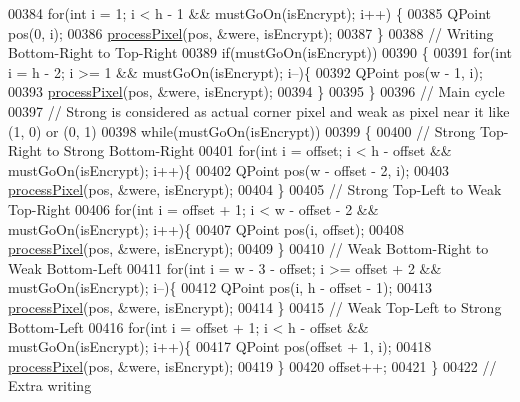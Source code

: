 \begin{DoxyCode}
00384     \textcolor{keywordflow}{for}(\textcolor{keywordtype}{int} i = 1; i < h - 1 && mustGoOn(isEncrypt); i++) \{
00385         QPoint pos(0, i);
00386         \hyperlink{class_model_p_c_a1171f9fe1550133dc9053a46b4e5bcfd}{processPixel}(pos, &were, isEncrypt);
00387     \}
00388     \textcolor{comment}{// Writing Bottom-Right to Top-Right}
00389     \textcolor{keywordflow}{if}(mustGoOn(isEncrypt))
00390     \{
00391         \textcolor{keywordflow}{for}(\textcolor{keywordtype}{int} i = h - 2; i >= 1 && mustGoOn(isEncrypt); i--)\{
00392             QPoint pos(w - 1, i);
00393             \hyperlink{class_model_p_c_a1171f9fe1550133dc9053a46b4e5bcfd}{processPixel}(pos, &were, isEncrypt);
00394         \}
00395     \}
00396     \textcolor{comment}{// Main cycle}
00397     \textcolor{comment}{// Strong is considered as actual corner pixel and weak as pixel near it like (1, 0) or (0, 1)}
00398     \textcolor{keywordflow}{while}(mustGoOn(isEncrypt))
00399     \{
00400         \textcolor{comment}{// Strong Top-Right to Strong Bottom-Right}
00401         \textcolor{keywordflow}{for}(\textcolor{keywordtype}{int} i = offset; i < h - offset && mustGoOn(isEncrypt); i++)\{
00402             QPoint pos(w - offset - 2, i);
00403             \hyperlink{class_model_p_c_a1171f9fe1550133dc9053a46b4e5bcfd}{processPixel}(pos, &were, isEncrypt);
00404         \}
00405         \textcolor{comment}{// Strong Top-Left to Weak Top-Right}
00406         \textcolor{keywordflow}{for}(\textcolor{keywordtype}{int} i = offset + 1; i < w - offset - 2 && mustGoOn(isEncrypt); i++)\{
00407             QPoint pos(i, offset);
00408             \hyperlink{class_model_p_c_a1171f9fe1550133dc9053a46b4e5bcfd}{processPixel}(pos, &were, isEncrypt);
00409         \}
00410         \textcolor{comment}{// Weak Bottom-Right to Weak Bottom-Left}
00411         \textcolor{keywordflow}{for}(\textcolor{keywordtype}{int} i = w - 3 - offset; i >= offset + 2 && mustGoOn(isEncrypt); i--)\{
00412             QPoint pos(i, h - offset - 1);
00413             \hyperlink{class_model_p_c_a1171f9fe1550133dc9053a46b4e5bcfd}{processPixel}(pos, &were, isEncrypt);
00414         \}
00415         \textcolor{comment}{// Weak Top-Left to Strong Bottom-Left}
00416         \textcolor{keywordflow}{for}(\textcolor{keywordtype}{int} i = offset + 1; i < h - offset && mustGoOn(isEncrypt); i++)\{
00417             QPoint pos(offset + 1, i);
00418             \hyperlink{class_model_p_c_a1171f9fe1550133dc9053a46b4e5bcfd}{processPixel}(pos, &were, isEncrypt);
00419         \}
00420         offset++;
00421     \}
00422     \textcolor{comment}{// Extra writing}

\end{DoxyCode}
